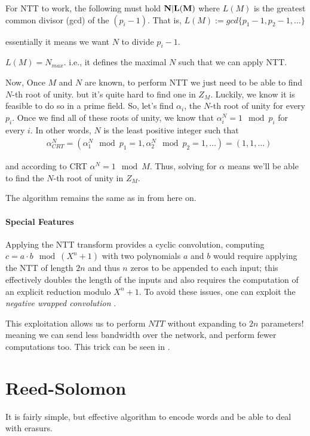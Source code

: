 For NTT to work, the following must hold $\bf N|L(M)$
where $L(M)$ is the greatest common
divisor (gcd) of the $(p_{i}-1)$. That is, 
$L(M):= gcd\{p_1-1,p_2-1,\dots\}$

essentially it means we want $ N$ to divide $p_i-1$.

\begin{corollary}
  $L(M)=N_{max}$. i.e., it defines the maximal $N$ 
  such that we can apply NTT.  
\end{corollary}

Now, Once $M$ and $N$ are known, to perform NTT we just need to be able to find 
$N$-th root of unity. but it's quite hard to find one in $Z_M$.
Luckily, we know it is feasible to do so in a prime field. 
So, let's find $\alpha_i$, the $N$-th root of unity for every $p_i$.
Once we find all of these roots of unity, we know that $\alpha_i^N=1 \mod p_i$ for every $i$.
In other words, $N$ is the least positive integer such that
\begin{align*}
  &\alpha_{CRT}^N = (\alpha_1^N \mod p_1=1, \alpha_2^N \mod p_2=1,\dots)= (1,1,\dots)
\end{align*}

and according to CRT $\alpha^N=1 \mod M$. Thus, solving for $\alpha$ 
means we'll be able to find the $N$-th root of unity in $Z_M$.

The algorithm remains the same as in  from here on.

\paragraph{Special Features}
Applying the NTT transform provides a cyclic convolution, computing 
$c = a \cdot b \mod (X^n + 1)$  with two polynomials $a$ and $b$ would require 
applying the NTT of length $2n$ and thus $n$ zeros to be appended to each input;
this effectively doubles the length of the inputs and also requires the computation of 
an explicit reduction modulo $X^n +1$. 
To avoid these issues, one can exploit the \emph{negative wrapped convolution} \cite{negantt}.

This exploitation allows us to perform $NTT$ without expanding to $2n$ parameters!
meaning we can send less bandwidth over the network, and perform fewer computations too. 
This trick can be seen in \cite{SEAL}.

\section{Reed-Solomon}
It is fairly simple, but effective algorithm to encode words and be able to deal with erasurs.
